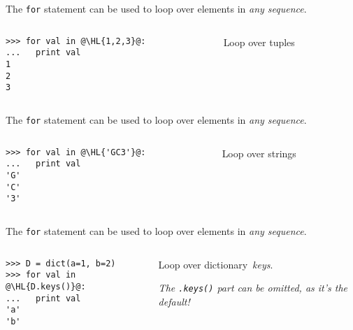 \documentclass[english,serif,mathserif,xcolor=pdftex,dvipsnames,table]{beamer}
\begin{document}
\begin{frame}[fragile]
  The \texttt{for} statement can be used to loop over elements in \emph{any sequence}.

  \+
  \begin{columns}[c]
    \begin{column}{0.5\textwidth}
\begin{lstlisting}
>>> for val in @\HL{1,2,3}@:
...   print val
1
2
3
\end{lstlisting}
    \end{column}
    \begin{column}{0.4\textwidth}
      \raggedleft 
      Loop over tuples
    \end{column}
  \end{columns}
\end{frame}

\begin{frame}[fragile]
  The \texttt{for} statement can be used to loop over elements in \emph{any sequence}.

  \+
  \begin{columns}[c]
    \begin{column}{0.5\textwidth}
\begin{lstlisting}
>>> for val in @\HL{'GC3'}@:
...   print val
'G'
'C'
'3'
\end{lstlisting}
    \end{column}
    \begin{column}{0.4\textwidth}
      \raggedleft 
      Loop over strings
    \end{column}
  \end{columns}
\end{frame}

\begin{frame}[fragile]
  The \texttt{for} statement can be used to loop over elements in \emph{any sequence}.

  \+
  \begin{columns}[c]
    \begin{column}{0.5\textwidth}
\begin{lstlisting}
>>> D = dict(a=1, b=2)
>>> for val in @\HL{D.keys()}@:
...   print val
'a'
'b'
\end{lstlisting}
    \end{column}
    \begin{column}{0.4\textwidth}
      \raggedleft 
      Loop over dictionary~\emph{keys}.

      \emph{The \texttt{.keys()} part can be omitted, as it's the
        default!}
    \end{column}
  \end{columns}
\end{frame}
\end{document}
